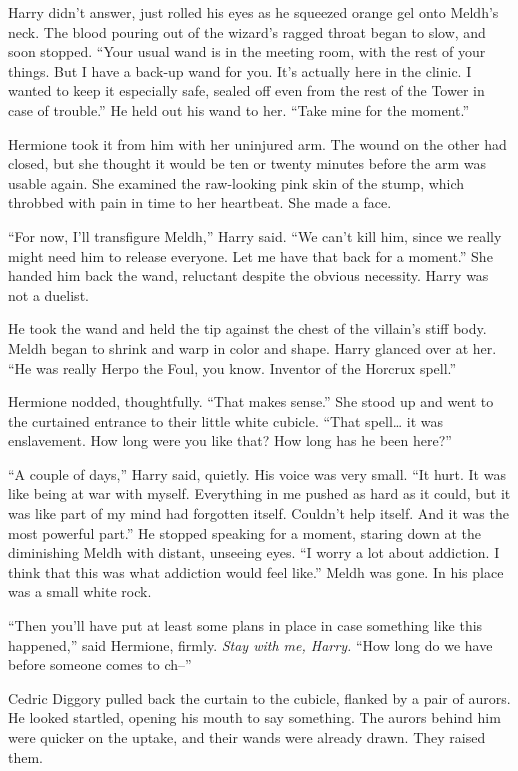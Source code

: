 Harry didn't answer, just rolled his eyes as he squeezed orange gel onto
Meldh's neck. The blood pouring out of the wizard's ragged throat began
to slow, and soon stopped. ``Your usual wand is in the meeting room,
with the rest of your things. But I have a back-up wand for you. It's
actually here in the clinic. I wanted to keep it especially safe, sealed
off even from the rest of the Tower in case of trouble.'' He held out
his wand to her. ``Take mine for the moment.''

Hermione took it from him with her uninjured arm. The wound on the other
had closed, but she thought it would be ten or twenty minutes before the
arm was usable again. She examined the raw-looking pink skin of the
stump, which throbbed with pain in time to her heartbeat. She made a
face.

``For now, I'll transfigure Meldh,'' Harry said. ``We can't kill him,
since we really might need him to release everyone. Let me have that
back for a moment.'' She handed him back the wand, reluctant despite the
obvious necessity. Harry was not a duelist.

He took the wand and held the tip against the chest of the villain's
stiff body. Meldh began to shrink and warp in color and shape. Harry
glanced over at her. ``He was really Herpo the Foul, you know. Inventor
of the Horcrux spell.''

Hermione nodded, thoughtfully. ``That makes sense.'' She stood up and
went to the curtained entrance to their little white cubicle. ``That
spell\ldots{} it was enslavement. How long were you like that? How long
has he been here?''

``A couple of days,'' Harry said, quietly. His voice was very small.
``It hurt. It was like being at war with myself. Everything in me pushed
as hard as it could, but it was like part of my mind had forgotten
itself. Couldn't help itself. And it was the most powerful part.'' He
stopped speaking for a moment, staring down at the diminishing Meldh
with distant, unseeing eyes. ``I worry a lot about addiction. I think
that this was what addiction would feel like.'' Meldh was gone. In his
place was a small white rock.

``Then you'll have put at least some plans in place in case something
like this happened,'' said Hermione, firmly. \emph{Stay with me, Harry.}
``How long do we have before someone comes to ch--''

Cedric Diggory pulled back the curtain to the cubicle, flanked by a pair
of aurors. He looked startled, opening his mouth to say something. The
aurors behind him were quicker on the uptake, and their wands were
already drawn. They raised them.

